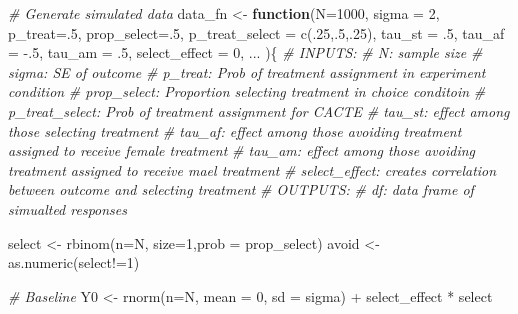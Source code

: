 \documentclass[
]{article}
\newenvironment{Shaded}{\begin{snugshade}}{\end{snugshade}}
\newcommand{\AttributeTok}[1]{\textcolor[rgb]{0.77,0.63,0.00}{#1}}
\newcommand{\CommentTok}[1]{\textcolor[rgb]{0.56,0.35,0.01}{\textit{#1}}}
\newcommand{\ControlFlowTok}[1]{\textcolor[rgb]{0.13,0.29,0.53}{\textbf{#1}}}
\newcommand{\DecValTok}[1]{\textcolor[rgb]{0.00,0.00,0.81}{#1}}
\newcommand{\FunctionTok}[1]{\textcolor[rgb]{0.00,0.00,0.00}{#1}}
\newcommand{\NormalTok}[1]{#1}
\newcommand{\OtherTok}[1]{\textcolor[rgb]{0.56,0.35,0.01}{#1}}
\newcommand{\SpecialCharTok}[1]{\textcolor[rgb]{0.00,0.00,0.00}{#1}}
\begin{document}
\begin{Shaded}
\begin{Highlighting}[]
\CommentTok{\# Generate simulated data}
\NormalTok{data\_fn }\OtherTok{\textless{}{-}} \ControlFlowTok{function}\NormalTok{(}\AttributeTok{N=}\DecValTok{1000}\NormalTok{, }
                    \AttributeTok{sigma =} \DecValTok{2}\NormalTok{,}
                    \AttributeTok{p\_treat=}\NormalTok{.}\DecValTok{5}\NormalTok{, }
                    \AttributeTok{prop\_select=}\NormalTok{.}\DecValTok{5}\NormalTok{, }
                    \AttributeTok{p\_treat\_select =} \FunctionTok{c}\NormalTok{(.}\DecValTok{25}\NormalTok{,.}\DecValTok{5}\NormalTok{,.}\DecValTok{25}\NormalTok{), }
                    \AttributeTok{tau\_st =}\NormalTok{ .}\DecValTok{5}\NormalTok{, }
                    \AttributeTok{tau\_af =} \SpecialCharTok{{-}}\NormalTok{.}\DecValTok{5}\NormalTok{,}
                    \AttributeTok{tau\_am =}\NormalTok{ .}\DecValTok{5}\NormalTok{,}
                    \AttributeTok{select\_effect =} \DecValTok{0}\NormalTok{,}
\NormalTok{                    ...}
\NormalTok{)\{}
  \CommentTok{\# INPUTS:}
    \CommentTok{\# N: sample size}
    \CommentTok{\# sigma: SE of outcome}
    \CommentTok{\# p\_treat: Prob of treatment assignment in experiment condition}
    \CommentTok{\# prop\_select: Proportion selecting treatment in choice conditoin}
    \CommentTok{\# p\_treat\_select: Prob of treatment assignment for CACTE}
    \CommentTok{\# tau\_st: effect among those selecting treatment}
    \CommentTok{\# tau\_af: effect among those avoiding treatment assigned to receive female treatment}
    \CommentTok{\# tau\_am: effect among those avoiding treatment assigned to receive mael treatment}
    \CommentTok{\# select\_effect: creates correlation between outcome and selecting treatment}
  \CommentTok{\# OUTPUTS:}
    \CommentTok{\# df: data frame of simualted responses}
  
\NormalTok{  select }\OtherTok{\textless{}{-}} \FunctionTok{rbinom}\NormalTok{(}\AttributeTok{n=}\NormalTok{N, }\AttributeTok{size=}\DecValTok{1}\NormalTok{,}\AttributeTok{prob =}\NormalTok{ prop\_select)}
\NormalTok{  avoid }\OtherTok{\textless{}{-}} \FunctionTok{as.numeric}\NormalTok{(select}\SpecialCharTok{!=}\DecValTok{1}\NormalTok{)}

  \CommentTok{\# Baseline}
\NormalTok{  Y0 }\OtherTok{\textless{}{-}} \FunctionTok{rnorm}\NormalTok{(}\AttributeTok{n=}\NormalTok{N, }\AttributeTok{mean =} \DecValTok{0}\NormalTok{, }\AttributeTok{sd =}\NormalTok{ sigma) }\SpecialCharTok{+}\NormalTok{ select\_effect }\SpecialCharTok{*}\NormalTok{ select}
  

\end{Highlighting}
\end{Shaded}
\end{document}
